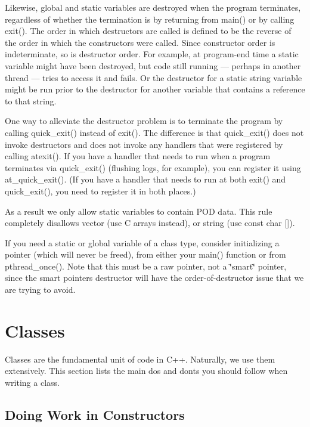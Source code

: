 Likewise, global and static variables are destroyed when the program terminates, regardless of whether the termination is by returning from {\ttfamily main()} or by calling {\ttfamily exit()}. The order in which destructors are called is defined to be the reverse of the order in which the constructors were called. Since constructor order is indeterminate, so is destructor order. For example, at program-\/end time a static variable might have been destroyed, but code still running — perhaps in another thread — tries to access it and fails. Or the destructor for a static {\ttfamily string} variable might be run prior to the destructor for another variable that contains a reference to that string.

One way to alleviate the destructor problem is to terminate the program by calling {\ttfamily quick\+\_\+exit()} instead of {\ttfamily exit()}. The difference is that {\ttfamily quick\+\_\+exit()} does not invoke destructors and does not invoke any handlers that were registered by calling {\ttfamily atexit()}. If you have a handler that needs to run when a program terminates via {\ttfamily quick\+\_\+exit()} (flushing logs, for example), you can register it {\ttfamily using at\+\_\+quick\+\_\+exit()}. (If you have a handler that needs to run at both exit() and quick\+\_\+exit(), you need to register it in both places.)

As a result we only allow static variables to contain P\+OD data. This rule completely disallows vector (use C arrays instead), or string (use const char \mbox{[}\mbox{]}).

If you need a static or global variable of a class type, consider initializing a pointer (which will never be freed), from either your main() function or from pthread\+\_\+once(). Note that this must be a raw pointer, not a \char`\"{}smart\char`\"{} pointer, since the smart pointer\textquotesingle{}s destructor will have the order-\/of-\/destructor issue that we are trying to avoid.

\section*{Classes}

Classes are the fundamental unit of code in C++. Naturally, we use them extensively. This section lists the main dos and don\textquotesingle{}ts you should follow when writing a class.

\subsection*{Doing Work in Constructors}

